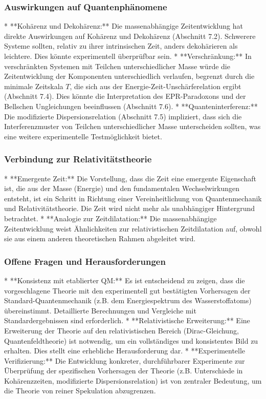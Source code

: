 \subsubsection{Auswirkungen auf Quantenphänomene}

*   **Kohärenz und Dekohärenz:** Die massenabhängige Zeitentwicklung hat direkte Auswirkungen auf Kohärenz und Dekohärenz (Abschnitt 7.2). Schwerere Systeme sollten, relativ zu ihrer intrinsischen Zeit, anders dekohärieren als leichtere. Dies könnte experimentell überprüfbar sein.
*   **Verschränkung:** In verschränkten Systemen mit Teilchen unterschiedlicher Masse würde die Zeitentwicklung der Komponenten unterschiedlich verlaufen, begrenzt durch die minimale Zeitskala $T$, die sich aus der Energie-Zeit-Unschärferelation ergibt (Abschnitt 7.4). Dies könnte die Interpretation des EPR-Paradoxons und der Bellschen Ungleichungen beeinflussen (Abschnitt 7.6).
*   **Quanteninterferenz:** Die modifizierte Dispersionsrelation (Abschnitt 7.5) impliziert, dass sich die Interferenzmuster von Teilchen unterschiedlicher Masse unterscheiden sollten, was eine weitere experimentelle Testmöglichkeit bietet.

\subsubsection{Verbindung zur Relativitätstheorie}

*   **Emergente Zeit:** Die Vorstellung, dass die Zeit eine emergente Eigenschaft ist, die aus der Masse (Energie) und den fundamentalen Wechselwirkungen entsteht, ist ein Schritt in Richtung einer Vereinheitlichung von Quantenmechanik und Relativitätstheorie. Die Zeit wird nicht mehr als unabhängiger Hintergrund betrachtet.
*   **Analogie zur Zeitdilatation:** Die massenabhängige Zeitentwicklung weist Ähnlichkeiten zur relativistischen Zeitdilatation auf, obwohl sie aus einem anderen theoretischen Rahmen abgeleitet wird.

\subsubsection{Offene Fragen und Herausforderungen}

*   **Konsistenz mit etablierter QM:** Es ist entscheidend zu zeigen, dass die vorgeschlagene Theorie mit den experimentell gut bestätigten Vorhersagen der Standard-Quantenmechanik (z.B. dem Energiespektrum des Wasserstoffatoms) übereinstimmt. Detaillierte Berechnungen und Vergleiche mit Standardergebnissen sind erforderlich.
*   **Relativistische Erweiterung:** Eine Erweiterung der Theorie auf den relativistischen Bereich (Dirac-Gleichung, Quantenfeldtheorie) ist notwendig, um ein vollständiges und konsistentes Bild zu erhalten. Dies stellt eine erhebliche Herausforderung dar.
*   **Experimentelle Verifizierung:** Die Entwicklung konkreter, durchführbarer Experimente zur Überprüfung der spezifischen Vorhersagen der Theorie (z.B. Unterschiede in Kohärenzzeiten, modifizierte Dispersionsrelation) ist von zentraler Bedeutung, um die Theorie von reiner Spekulation abzugrenzen.

